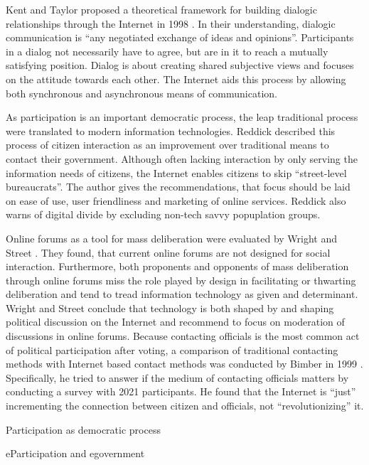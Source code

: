 Kent and Taylor proposed a theoretical framework for building dialogic relationships through the Internet in 1998 \cite{Kent1998_dialogic_relationships_through_www}. In their understanding, dialogic communication is ``any negotiated exchange of ideas and opinions''. Participants in a dialog not necessarily have to agree, but are in it to reach a mutually satisfying position. Dialog is about creating shared subjective views and focuses on the attitude towards each other. The Internet aids this process by allowing both synchronous and asynchronous means of communication.

As participation is an important democratic process, the leap traditional process were translated to modern information technologies. Reddick \cite{Reddick2005_Citizen_interaction_with_egovernment} described this process of citizen interaction as an improvement over traditional means to contact their government. Although often lacking interaction by only serving the information needs of citizens, the Internet enables citizens to skip ``street-level bureaucrats''. The author gives the recommendations, that focus should be laid on ease of use, user friendliness and marketing of online services. Reddick also warns of digital divide by excluding non-tech savvy popuplation groups.

Online forums as a tool for mass deliberation were evaluated by Wright and Street \cite{Wright2007_deliberation_design}. They found, that current online forums are not designed for social interaction. Furthermore, both proponents and opponents of mass deliberation through online forums miss the role played by design in facilitating or thwarting deliberation and tend to tread information technology as given and determinant. Wright and Street conclude that technology is both shaped by and shaping political discussion on the Internet and recommend to focus on moderation of discussions in online forums. 
Because contacting officials is the most common act of political participation after voting, a comparison of traditional contacting methods with Internet based contact methods was conducted by Bimber in 1999 \cite{Bimber1999_Citizen_communication_with_government}. Specifically, he tried to answer if the medium of contacting officials matters by conducting a survey with 2021 participants. He found that the Internet is ``just'' incrementing the connection between citizen and officials, not ``revolutionizing'' it.

Participation as democratic process 


eParticipation and egovernment  \cite{Jaeger2005_deliberate_democracy_and_egovernment} \cite{Macintosh2004_eParticipation_characterization}


